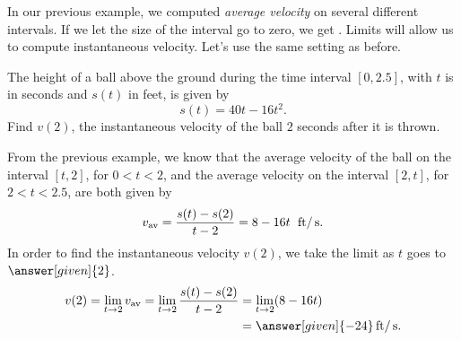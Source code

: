 \documentclass{ximera}
\begin{document}
In our previous example, we computed \textit{average velocity} on
several different intervals. If we let the size of the interval go to
zero, we get . Limits will allow us to
compute instantaneous velocity.  Let's use the same setting as before.

\begin{example}
The height of a ball above the ground during the time interval  $[0,2.5]$, with $t$ is in seconds and $s(t)$ in feet, 
is given by
\[
s(t) = 40t - 16t^2.
\] 
Find $v(2)$, the instantaneous velocity of the ball $2$ seconds after it
is thrown.

\begin{explanation}
From the previous example, we know that the average velocity of the
ball on the interval $[t,2]$, for $0<t<2$, and the average velocity
on the interval $[2,t]$, for $2<t<2.5$, are both given by
\[
v_{\text{av}} =  \frac{s(t)-s(2)}{t-2}= 8-16t \hspace{0.06in}\mathop{}\!\mathrm{ft}/\mathop{}\!\mathrm{s}.
\]
In order to find the instantaneous velocity $v(2)$, we 
take the limit as $t$ goes to $\answer[given]{2}$. 
\begin{align*}
v (2)= \lim_{t\to2}v_{\text{av}}
=\lim_{t\to2}  \frac{s(t)-s(2)}{t-2}
&= \lim_{t\to2}(8-16t)\\
&= \answer[given]{-24}\unit{ft}/\unit{s}.
\end{align*}
\end{explanation}
\end{example}
\end{document}
